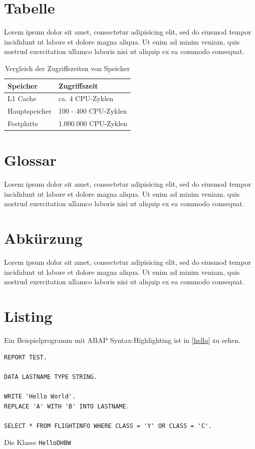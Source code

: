 \section{Tabelle}
Lorem ipsum dolor sit amet, consectetur adipisicing elit, sed do eiusmod tempor incididunt ut labore et dolore magna aliqua. Ut enim ad minim veniam, quis nostrud exercitation ullamco laboris nisi ut aliquip ex ea commodo consequat.

\begin{table}[htbp]%
\centering%
\begin{tabular}{| p{3cm} | p{5cm} |}
\hline
Speicher & Zugriffszeit \\
\hline
\hline
L1 Cache & ca. 4 CPU-Zyklen  \\ \hline
Hauptspeicher & 100 - 400 CPU-Zyklen \\ \hline
Festplatte & 1.000.000 CPU-Zyklen \\ \hline
\end{tabular} 
\caption[Vergleich der Zugriffszeiten von Speicher]{Vergleich der Zugriffszeiten von Speicher\label{table:zugriff}\protect \footnotemark}
\end{table}

\section{Glossar}
Lorem ipsum dolor sit amet, consectetur adipisicing elit, sed do eiusmod tempor incididunt ut labore et dolore magna aliqua. Ut enim ad minim veniam, quis nostrud exercitation ullamco laboris nisi ut aliquip ex ea commodo consequat.

\section{Abkürzung}
Lorem ipsum dolor sit amet, consectetur adipisicing elit, sed do eiusmod tempor incididunt ut labore et dolore magna aliqua. Ut enim ad minim veniam, quis nostrud exercitation ullamco laboris nisi ut aliquip ex ea commodo consequat.

\section{Listing}
Ein Beispielprogramm mit ABAP Syntax-Highlighting ist in \vref{hello} zu sehen.

\begin{programm}[htbp]
\begin{lstlisting}
REPORT TEST.

DATA LASTNAME TYPE STRING.

WRITE 'Hello World'.
REPLACE 'A' WITH 'B' INTO LASTNAME.

SELECT * FROM FLIGHTINFO WHERE CLASS = 'Y' OR CLASS = 'C'.
\end{lstlisting}
\caption{Die Klasse \texttt{HelloDHBW}\label{hello}}
\end{programm}

